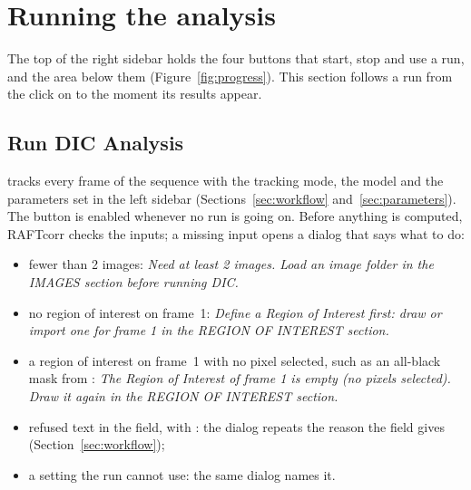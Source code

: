\section{Running the analysis}
\label{sec:running}

The top of the right sidebar holds the four buttons that start, stop and use a run, and the
 area below them (Figure~\ref{fig:progress}). This section follows a run from the
click on  to the moment its results appear.


\subsection{Run DIC Analysis}

 tracks every frame of the sequence with the tracking mode, the model and
the parameters set in the left sidebar (Sections~\ref{sec:workflow} and~\ref{sec:parameters}).
The button is enabled whenever no run is going on. Before anything is computed, RAFTcorr checks
the inputs; a missing input opens a  dialog that says what to do:

\begin{itemize}
  \item fewer than 2 images: \emph{Need at least 2 images. Load an image folder in the IMAGES
        section before running DIC.}
  \item no region of interest on frame~1: \emph{Define a Region of Interest first: draw or
        import one for frame 1 in the REGION OF INTEREST section.}
  \item a region of interest on frame~1 with no pixel selected, such as an all-black mask from
        : \emph{The Region of Interest of frame 1 is empty (no pixels selected).
        Draw it again in the REGION OF INTEREST section.}
  \item refused text in the  field, with : the dialog
        repeats the reason the field gives (Section~\ref{sec:workflow});
  \item a setting the run cannot use: the same dialog names it.
\end{itemize}

